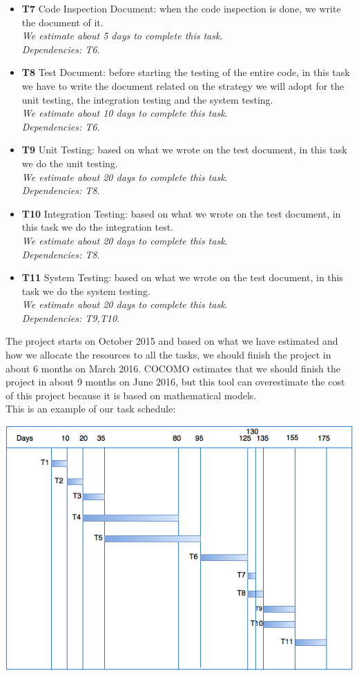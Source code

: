 \documentclass[18pt,oneside,a4paper, titlepage]{article}
\begin{document}
\begin{itemize}
		\item \textbf{T7} Code Inspection Document: when the code inspection is done, we write the document of it.\\ \textit{We estimate about 5 days to complete this task}.\\ \textit{Dependencies: T6}.
		\item \textbf{T8} Test Document: before starting the testing of the entire code, in this task we have to write the document related on the strategy we will adopt for the unit testing, the integration testing and the system testing.\\ \textit{We estimate about 10 days to complete this task}.\\ \textit{Dependencies: T6}.
		\item \textbf{T9} Unit Testing: based on what we wrote on the  test document, in this task we do the unit testing.\\ \textit{We estimate about 20 days to complete this task}.\\ \textit{Dependencies: T8}.
		\item \textbf{T10} Integration Testing: based on what we wrote on the test document, in this task we do the integration test.\\ \textit{We estimate about 20 days to complete this task}.\\ \textit{Dependencies: T8}.
		\item \textbf{T11} System Testing: based on what we wrote on the  test document, in this task we do the system testing.\\ \textit{We estimate about 20 days to complete this task}.\\ \textit{Dependencies: T9,T10}.
	\end{itemize}
	The project starts on October 2015 and based on what we have estimated and how we allocate the resources to all the tasks, we should finish the project in about 6 months on March 2016. COCOMO estimates that we should finish the project in about 9 months on June 2016, but this tool can overestimate the cost of this project because it is based on mathematical models.\\ This is an example of our task schedule:\\
	\begin{center}
	\centering
	\includegraphics[scale=0.7]{scheduleTask.png}
	\end{center}
\end{document}
